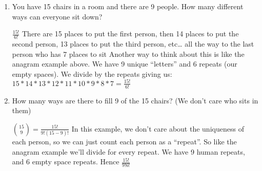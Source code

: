 \question 
\begin{enumerate}[label=(\alph*)]
\item
You have 15 chairs in a room and there are 9 people. How many different 
ways can everyone sit down?
\begin{solution}[1 in]
$\frac{15!}{6!}$
There are 15 places to put the first person, then 14 places to put the 
second person, 13 places to put the third person, etc… all the way to 
the last person who has 7 places to sit
Another way to think about this is like the anagram example above. We 
have 9 unique “letters” and 6 repeats (our empty spaces). We divide by 
the repeats giving us:
$15*14*13*12*11*10*9*8*7 = \frac{15!}{6!}$
 \end{solution}
 
\item How many ways are there to fill 9 of the 15 chairs? (We don’t 
care who sits in them)

\begin{solution}
${15 \choose 9}  = \frac{15!}{9!(15-9)!}$
In this example, we don’t care about the uniqueness of each person, 
so we can just count each person as a “repeat”. So like the anagram 
example we’ll divide for every repeat. We have 9 human repeats, and 
6 empty space repeats. Hence $\frac{15!}{9!6!}$
\end{solution}

\end{enumerate}